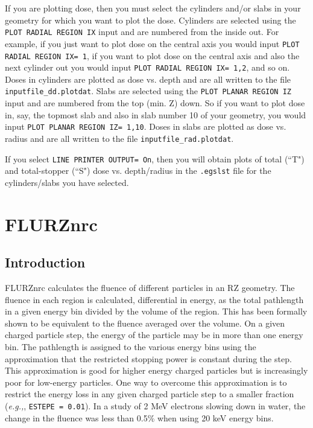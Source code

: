 \documentclass[12pt,twoside]{article}  %
\begin{document}
If you are plotting dose, then you must select the cylinders and/or slabs
in your geometry for which you want to plot the dose.  Cylinders are selected
using the {\tt PLOT RADIAL REGION IX} input and are numbered from
the inside out.  For example, if you just want to plot dose on the
central axis you would input {\tt PLOT RADIAL REGION IX= 1}, if you want
to plot dose on the central axis and also the next cylinder out you would
input {\tt PLOT RADIAL REGION IX= 1,2}, and so on.  Doses in cylinders are
plotted as dose vs. depth and are all written to the file
{\tt inputfile\_dd.plotdat}.   Slabs are selected using the
{\tt PLOT PLANAR REGION IZ} input and are numbered from the top (min. Z)
down.  So if you want to plot dose in, say, the topmost slab and also in
slab number 10 of your geometry, you would input
{\tt PLOT PLANAR REGION IZ= 1,10}.  Doses in slabs are plotted as dose vs. radius and are all written to the file {\tt inputfile\_rad.plotdat}.

If you select {\tt LINE PRINTER OUTPUT= On}, then you will obtain plots
of total (``T") and total-stopper (``S") dose vs. depth/radius in the
{\tt .egslst} file
for the cylinders/slabs you have selected.

\section{FLURZnrc}
\renewcommand{\leftmark}{{FLURZnrc}}

\subsection{Introduction}

FLURZnrc calculates the fluence of different particles in an RZ geometry.
The fluence in each region is calculated, differential in energy, as the total pathlength
in a given energy bin divided by the volume of the region. This has been
formally shown to be equivalent to the fluence averaged over the
volume\cite{Ch78,Ch79}.
On a given charged particle step, the energy of the particle may be in more
than one energy bin. The pathlength is assigned to the various energy bins
using the approximation that the restricted stopping power is constant
during the step. This approximation is good for higher energy charged
particles but is increasingly poor for low-energy particles. One way to
overcome this approximation is to restrict the energy loss in any given
charged particle step to a smaller fraction ({\em e.g.,}, {\tt ESTEPE = 0.01}). In a study of 2 MeV electrons slowing down in water, the change in the
fluence was less than 0.5\% when using 20 keV energy bins.
\end{document}
